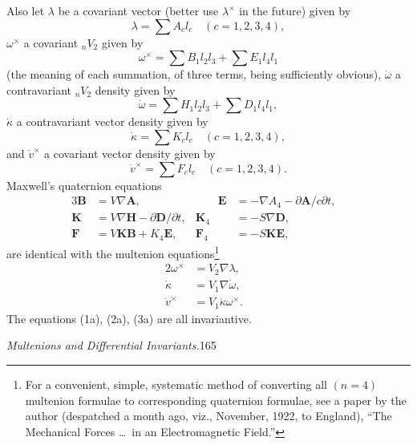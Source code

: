 \documentclass[11pt]{article}
\begin{document}
\indent Also let $\lambda$ be a covariant vector (better use $\lambda^\times$ in the future) given by
\[
  \lambda=\sum A_cl_c\quad(c=1,2,3,4),
\]
$\omega^\times$ a covariant ${}_nV_2$ given by
\[
  \omega^\times=\sum B_1l_2l_3+\sum E_1l_4l_1
\]
(the meaning of each summation, of three terms, being sufficiently obvious), $\dot\omega$ a contravariant ${}_nV_2$ density given by
\[
  \dot\omega=\sum H_1l_2l_3+\sum D_1l_4l_1,
\]
$\dot\kappa$ a contravariant vector density given by
\[
  \dot\kappa=\sum K_cl_c\quad(c=1,2,3,4),
\]
and $\dot v^\times$ a covariant vector density given by
\[
  \dot v^\times=\sum F_cl_c\quad(c=1,2,3,4).
\]
Maxwell's quaternion equations
\begin{alignat}{3}
  \mathbf{B}&=V\nabla\mathbf{A}, &\qquad \mathbf{E}&=-\nabla A_4-\partial\mathbf{A}/c\partial t, &\tag{1}\\
  \mathbf{K}&=V\nabla\mathbf{H}-\partial\mathbf{D}/\partial t, & \mathbf{K}_4&=-S\nabla\mathbf{D}, &\tag{2}\\
  \mathbf{F}&=V\mathbf{K}\mathbf{B}+K_4\mathbf{E}, & \mathbf{F}_4&=-S\mathbf{K}\mathbf{E}, &\tag{3}
\end{alignat}
are identical with the multenion equations\footnote{For a convenient, simple, systematic method of converting all $(n=4)$ multenion formulae to corresponding quaternion formulae, see a paper by the author (despatched a month ago, viz., November, 1922, to England), ``The Mechanical Forces \ldots\ in an Electromagnetic Field.''}
\begin{alignat}{2}
  \omega^\times&=V_2\nabla\lambda, &\tag{1a}\\
  \dot\kappa&=V_1\nabla\dot\omega, &\tag{2a}\\
  \dot v^\times&=V_1\dot\kappa\omega^\times. &\tag{3a}
\end{alignat}
The equations (1a), (2a), (3a) are all invariantive.

\newpage\thispagestyle{empty}\begin{center}\textit{Multenions and Differential Invariants.}\hfill 165\end{center}
\end{document}
